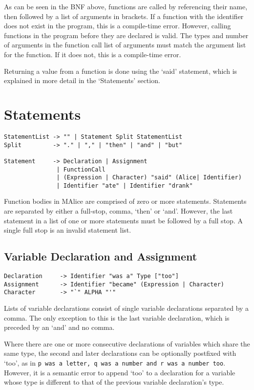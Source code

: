 \documentclass[a4wide, 11pt]{article}
\begin{document}
As can be seen in the BNF above, functions are called by referencing their name, then followed by a list of arguments in brackets. If a function with the identifier does not exist in the program, this is a compile-time error. However, calling functions in the program before they are declared is valid. The types and number of arguments in the function call list of arguments must match the argument list for the function. If it does not, this is a compile-time error.

Returning a value from a function is done using the `said' statement, which is explained in more detail in the `Statements' section.

\section{Statements}

\begin{verbatim}
StatementList -> "" | Statement Split StatementList
Split         -> "." | "," | "then" | "and" | "but"

Statement     -> Declaration | Assignment
               | FunctionCall
               | (Expression | Character) "said" (Alice| Identifier)
               | Identifier "ate" | Identifier "drank"
\end{verbatim}

Function bodies in MAlice are comprised of zero or more statements. Statements are separated by either a full-stop, comma, `then' or `and'. However, the last statement in a list of one or more statements must be followed by a full stop. A single full stop is an invalid statement list.

\subsection{Variable Declaration and Assignment}

\begin{verbatim}
Declaration     -> Identifier "was a" Type ["too"]
Assignment      -> Identifier "became" (Expression | Character)
Character       -> "`" ALPHA "'"
\end{verbatim}

Lists of variable declarations consist of single variable declarations separated by a comma. The only exception to this is the last variable declaration, which is preceded by an `and' and no comma.

Where there are one or more consecutive declarations of variables which share the same type, the second and later declarations can be optionally postfixed with `too', as in \texttt{p was a letter, q was a number and r was a number too}. However, it is a semantic error to append `too' to a declaration for a variable whose type is different to that of the previous variable declaration's type.
\end{document}
